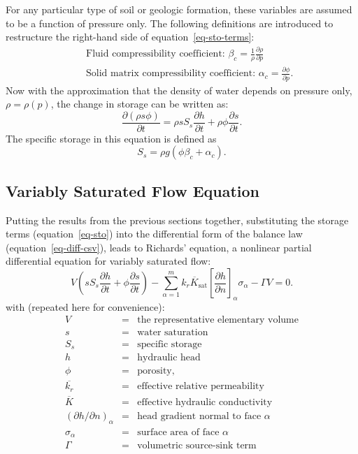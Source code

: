 \documentclass[fleqn]{article}
\begin{document}
For any particular type of soil or geologic formation, these variables
are assumed to be a function of pressure only. The following definitions
are introduced to restructure the right-hand side of
equation~\ref{eq-sto-terms}:
\begin{eqnarray*}
  &&\text{Fluid compressibility coefficient: }
  \beta_c = \frac{1}{\rho} \frac{\partial \rho}{\partial p} \\
  &&\text{Solid matrix compressibility coefficient: }
  \alpha_c = \frac{\partial \phi}{\partial p}.
\end{eqnarray*}
Now with the approximation that the density of water depends on
pressure only, $\rho = \rho(p)$, the change in storage can be written
as:
\begin{equation}
  \frac{\partial (\rho s \phi)}{\partial t} =
  \rho s S_s \frac{\partial h}{\partial t} +
  \rho \phi \frac{\partial s}{\partial t}.
  \label{eq-sto}
\end{equation}
The specific storage in this equation is defined as
\begin{equation}
  S_s = \rho g \left( \phi \beta_c + \alpha_c \right).
  \label{eq-spec-sto}
\end{equation}

\subsection{Variably Saturated Flow Equation}
Putting the results from the previous sections together,
substituting the storage terms (equation~\ref{eq-sto}) into the 
differential form of the balance law (equation~\ref{eq-diff-csv}), 
leads to Richards' equation, a nonlinear partial differential equation for 
variably saturated flow:
\begin{equation}  
  V
  \left(
  s S_s \frac{\partial h}{\partial t} + 
  \phi \frac{\partial s}{\partial t}
  \right) -
  \sum_{\alpha=1}^{m} \overline{k_r K_{\textrm{sat}}}
  \left[\frac{\partial h}{\partial n}\right]_\alpha \sigma_\alpha -
  \Gamma V = 0.
  \label{eq-unsat-flow}
\end{equation}
with (repeated here for convenience):
\begin{eqnarray*}
  V &=& \text{the representative elementary volume} \\
  s &=& \text{water saturation} \\
  S_s &=& \text{specific storage} \\
  h &=& \text{hydraulic head} \\
  \phi &=& \text{porosity}, \\
  \overline{k_r} &=& \text{effective relative permeability} \\
  \overline{K} &=& \text{effective hydraulic conductivity} \\
  (\partial h/\partial n)_\alpha &=& \text{head gradient normal to face $\alpha$} \\
  \sigma_\alpha &=& \text{surface area of face $\alpha$} \\
  \Gamma &=& \text{volumetric source-sink term}
\end{eqnarray*}
\end{document}

